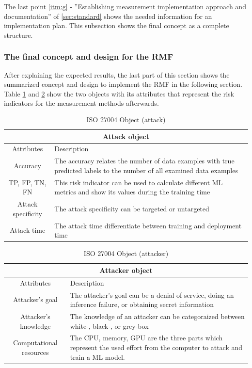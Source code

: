The last point \ref{itm:g} - ''Establishing measurement implementation approach and documentation'' of \ref{sec:standard} shows the needed information for an implementation plan. This subsection shows the final concept as a complete structure.

\subsubsection*{The final concept and design for the RMF}

After explaining the expected results, the last part of this section shows the summarized concept and design to implement the RMF in the following section. Table \ref{tab:attack} and \ref{tab:attacker} show the two objects with its attributes that represent the risk indicators for the measurement methods afterwards.

\begin{table}[h]
\centering
  \begin{tabular}{|c|p{10cm}|}
  \hline
  \multicolumn{2}{|c|}{Attack object} \\
  \hline
  \rowcolor{lightgray} Attributes & Description \\ [0.5ex]
  \hline
  Accuracy & The accuracy relates the number of data examples with true predicted labels to the number of all examined data examples \cite{9783960101925} \\
  \hline
  TP, FP, TN, FN & This risk indicator can be used to calculate different ML metrics and show its values during the training time \\
  \hline
  Attack specificity & The attack specificity can be targeted or untargeted \\
  \hline
  Attack time & The attack time differentiate between training and deployment time \\
  \hline
  \end{tabular}
\caption{ISO 27004 Object (attack)}
\label{tab:attack}
\end{table}

\begin{table}[h]
\centering
  \begin{tabular}{| c | p{10cm} |}
  \hline
  \multicolumn{2}{|c|}{Attacker object} \\
  \hline
  \rowcolor{lightgray} Attributes & Description \\ [0.5ex]
  \hline
  Attacker's goal & The attacker's goal can be a denial-of-service, doing an inference failure, or obtaining secret information \\
  \hline
  Attacker's knowledge & The knowledge of an attacker can be categoraized between white-, black-, or grey-box \\
  \hline
  Computational resources & The CPU, memory, GPU are the three parts which represent the used effort from the computer to attack and train a ML model. \\
  \hline
  \end{tabular}
\caption{ISO 27004 Object (attacker)}
\label{tab:attacker}
\end{table}


